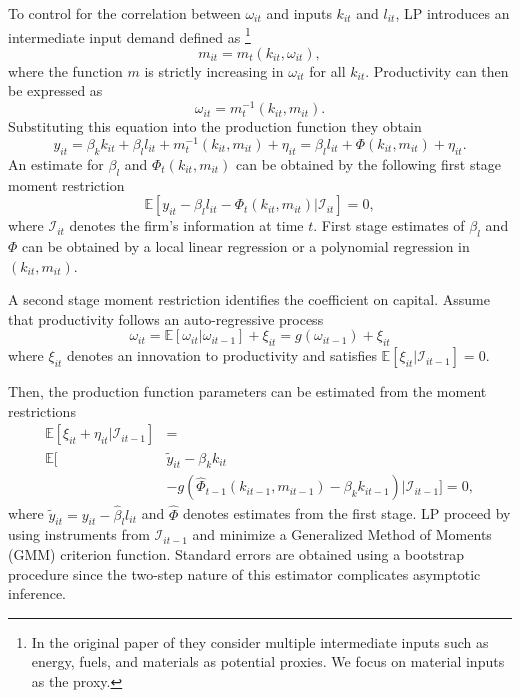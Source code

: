 \documentclass[11pt]{article}
\begin{document}
To control for the correlation between $\omega_{it}$ and inputs $k_{it}$ and $l_{it}$, LP introduces an intermediate input demand defined as \footnote{In the original paper of \cite{Levinsohn2003} they consider multiple intermediate inputs such as energy, fuels, and materials as potential proxies. We focus on material inputs as the proxy.}
\begin{equation}
m_{it}=m_{t}(k_{it}, \omega_{it}),
\end{equation}
where the function $m$ is strictly increasing in $\omega_{it}$ for all $k_{it}$. Productivity can then be expressed as
\begin{equation}
\omega_{it}=m_{t}^{-1}(k_{it}, m_{it}).
\end{equation}
Substituting this equation into the production function they obtain
\begin{equation}
y_{it}=\beta_{k}k_{it}+\beta_{l}l_{it}+m^{-1}_{t}(k_{it}, m_{it})+\eta_{it}=\beta_{l}l_{it}+\Phi(k_{it}, m_{it})+\eta_{it}.
\end{equation}
An estimate for $\beta_{l}$ and $\Phi_{t}(k_{it}, m_{it})$ can be obtained by the following first stage moment restriction
\begin{equation}
\mathbb{E}[y_{it}-\beta_{l}l_{it}-\Phi_{t}(k_{it}, m_{it})|\mathcal{I}_{it}]=0,
\end{equation}
where $\mathcal{I}_{it}$ denotes the firm's information at time $t$. First stage estimates of $\beta_{l}$ and $\Phi$ can be obtained by a local linear regression or a polynomial regression in $(k_{it}, m_{it})$.

A second stage moment restriction identifies the coefficient on capital. Assume that productivity follows an auto-regressive process
\begin{equation}
\omega_{it}=\mathbb{E}[\omega_{it}|\omega_{it-1}]+\xi_{it}=g(\omega_{it-1})+\xi_{it}
\end{equation}
where $\xi_{it}$ denotes an innovation to productivity and satisfies $\mathbb{E}[\xi_{it}|\mathcal{I}_{it-1}]=0$.

Then, the production function parameters can be estimated from the moment restrictions
\begin{equation}
\begin{split}
\mathbb{E}[\xi_{it}+\eta_{it}|\mathcal{I}_{it-1}]&=\\
\mathbb{E}[&\tilde{y}_{it}-\beta_{k}k_{it}\\
&-g(\hat{\Phi}_{t-1}(k_{it-1}, m_{it-1})-\beta_{k}k_{it-1})|\mathcal{I}_{it-1}]=0,
\end{split}
\end{equation}
where $\tilde{y}_{it}=y_{it}-\hat{\beta}_{l}l_{it}$ and $\hat{\Phi}$ denotes estimates from the first stage. LP proceed by using instruments from $\mathcal{I}_{it-1}$ and minimize a Generalized Method of Moments (GMM) criterion function. Standard errors are obtained using a bootstrap procedure since the two-step nature of this estimator complicates asymptotic inference.
\end{document}
